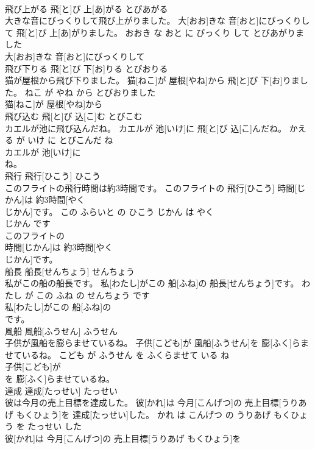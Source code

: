 \documentclass[8pt]{extreport}
\begin{document}
\begin{CJK}{UTF8}{min}
\\	飛び上がる	飛[と]び 上[あ]がる	とびあがる	
\\	大きな音にびっくりして飛び上がりました。	大[おお]きな 音[おと]にびっくりして 飛[と]び 上[あ]がりました。	おおき な おと に びっくり して とびあがりました	
\\	大[おお]きな 音[おと]にびっくりして
\\	飛び下りる	飛[と]び 下[お]りる	とびおりる	
\\	猫が屋根から飛び下りました。	猫[ねこ]が 屋根[やね]から 飛[と]び 下[お]りました。	ねこ が やね から とびおりました	
\\	猫[ねこ]が 屋根[やね]から
\\	飛び込む	飛[と]び 込[こ]む	とびこむ	
\\	カエルが池に飛び込んだね。	カエルが 池[いけ]に 飛[と]び 込[こ]んだね。	かえる が いけ に とびこんだ ね	
\\	カエルが 池[いけ]に
\\	ね。			
\\	飛行	飛行[ひこう]	ひこう	
\\	このフライトの飛行時間は約3時間です。	このフライトの 飛行[ひこう] 時間[じかん]は 約3時間[やく 
\\	じかん]です。	この ふらいと の ひこう じかん は やく 
\\	じかん です	
\\	このフライトの
\\	時間[じかん]は 約3時間[やく 
\\	じかん]です。			
\\	船長	船長[せんちょう]	せんちょう	
\\	私がこの船の船長です。	私[わたし]がこの 船[ふね]の 船長[せんちょう]です。	わたし が この ふね の せんちょう です	
\\	私[わたし]がこの 船[ふね]の
\\	です。			
\\	風船	風船[ふうせん]	ふうせん	
\\	子供が風船を膨らませているね。	子供[こども]が 風船[ふうせん]を 膨[ふく]らませているね。	こども が ふうせん を ふくらませて いる ね	
\\	子供[こども]が
\\	を 膨[ふく]らませているね。			
\\	達成	達成[たっせい]	たっせい	
\\	彼は今月の売上目標を達成した。	彼[かれ]は 今月[こんげつ]の 売上目標[うりあげ もくひょう]を 達成[たっせい]した。	かれ は こんげつ の うりあげ もくひょう を たっせい した	
\\	彼[かれ]は 今月[こんげつ]の 売上目標[うりあげ もくひょう]を

\end{CJK}
\end{document}
